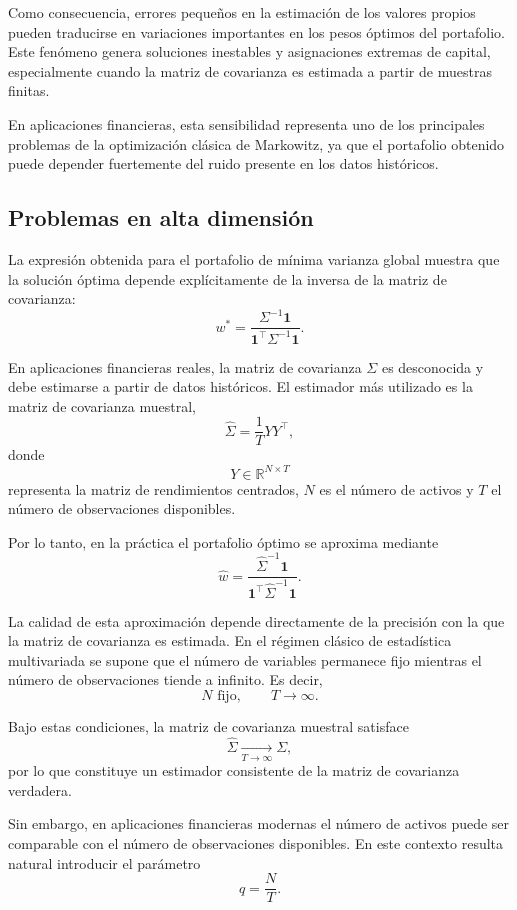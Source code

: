 \documentclass[letterpaper,12pt,oneside]{book}
\begin{document}
Como consecuencia, errores pequeños en la estimación de los valores propios pueden traducirse en variaciones importantes en los pesos óptimos del portafolio. Este fenómeno genera soluciones inestables y asignaciones extremas de capital, especialmente cuando la matriz de covarianza es estimada a partir de muestras finitas.

En aplicaciones financieras, esta sensibilidad representa uno de los principales problemas de la optimización clásica de Markowitz, ya que el portafolio obtenido puede depender fuertemente del ruido presente en los datos históricos.

\subsection{Problemas en alta dimensión}

La expresión obtenida para el portafolio de mínima varianza global muestra que la solución óptima depende explícitamente de la inversa de la matriz de covarianza:
\[
w^*
=
\frac{
\Sigma^{-1}\mathbf{1}
}{
\mathbf{1}^\top
\Sigma^{-1}\mathbf{1}
}.
\]

En aplicaciones financieras reales, la matriz de covarianza \(\Sigma\) es desconocida y debe estimarse a partir de datos históricos. El estimador más utilizado es la matriz de covarianza muestral,
\[
\widehat{\Sigma}
=
\frac{1}{T}YY^\top,
\]
donde
\[
Y\in\mathbb{R}^{N\times T}
\]
representa la matriz de rendimientos centrados, \(N\) es el número de activos y \(T\) el número de observaciones disponibles.

Por lo tanto, en la práctica el portafolio óptimo se aproxima mediante
\[
\widehat{w}
=
\frac{
\widehat{\Sigma}^{-1}\mathbf{1}
}{
\mathbf{1}^\top
\widehat{\Sigma}^{-1}\mathbf{1}
}.
\]

La calidad de esta aproximación depende directamente de la precisión con la que la matriz de covarianza es estimada. En el régimen clásico de estadística multivariada se supone que el número de variables permanece fijo mientras el número de observaciones tiende a infinito. Es decir,
\[
N \text{ fijo},
\qquad
T\to\infty.
\]

Bajo estas condiciones, la matriz de covarianza muestral satisface
\[
\widehat{\Sigma}
\xrightarrow[T\to\infty]{}
\Sigma,
\]
por lo que constituye un estimador consistente de la matriz de covarianza verdadera.

Sin embargo, en aplicaciones financieras modernas el número de activos puede ser comparable con el número de observaciones disponibles. En este contexto resulta natural introducir el parámetro
\[
q=\frac{N}{T}.
\]
\end{document}
